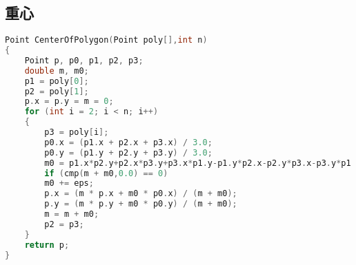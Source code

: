 \subsection{重心}
	\begin{lstlisting}[language=c++]
Point CenterOfPolygon(Point poly[],int n)
{
	Point p, p0, p1, p2, p3;
	double m, m0;
	p1 = poly[0];
	p2 = poly[1];
	p.x = p.y = m = 0;
	for (int i = 2; i < n; i++)
	{
		p3 = poly[i];
		p0.x = (p1.x + p2.x + p3.x) / 3.0;
		p0.y = (p1.y + p2.y + p3.y) / 3.0;
		m0 = p1.x*p2.y+p2.x*p3.y+p3.x*p1.y-p1.y*p2.x-p2.y*p3.x-p3.y*p1.x;
		if (cmp(m + m0,0.0) == 0)
		m0 += eps;
		p.x = (m * p.x + m0 * p0.x) / (m + m0);
		p.y = (m * p.y + m0 * p0.y) / (m + m0);
		m = m + m0;
		p2 = p3;
	}
	return p;
}
	\end{lstlisting}
